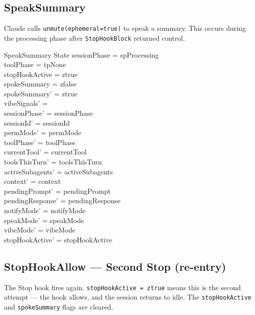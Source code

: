 \documentclass[a4paper,10pt,fleqn]{article}
\begin{document}
\subsection{SpeakSummary}

Claude calls \texttt{unmute(ephemeral=true)} to speak a summary.
This occurs during the processing phase after \texttt{StopHookBlock}
returned control.

\begin{schema}{SpeakSummary}
  \Delta State
  \where
  sessionPhase = spProcessing \\
  toolPhase = tpNone \\
  stopHookActive = ztrue \\
  spokeSummary = zfalse \\
  spokeSummary' = ztrue \\
  vibeSignals' = \emptyset \\
  sessionPhase' = sessionPhase \\
  sessionId' = sessionId \\
  permMode' = permMode \\
  toolPhase' = toolPhase \\
  currentTool' = currentTool \\
  toolsThisTurn' = toolsThisTurn \\
  activeSubagents' = activeSubagents \\
  context' = context \\
  pendingPrompt' = pendingPrompt \\
  pendingResponse' = pendingResponse \\
  notifyMode' = notifyMode \\
  speakMode' = speakMode \\
  vibeMode' = vibeMode \\
  stopHookActive' = stopHookActive
\end{schema}

\subsection{StopHookAllow --- Second Stop (re-entry)}

The Stop hook fires again. \texttt{stopHookActive = ztrue} means
this is the second attempt --- the hook allows, and the session
returns to idle. The \texttt{stopHookActive} and \texttt{spokeSummary}
flags are cleared.
\end{document}

